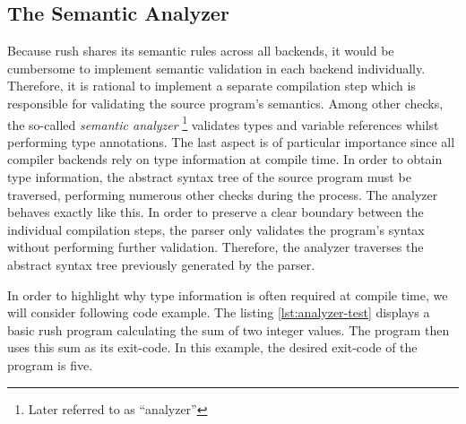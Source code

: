\subsection{The Semantic Analyzer}
Because rush shares its semantic rules across all backends,
it would be cumbersome to implement semantic validation in each
backend individually. Therefore, it is rational to implement a separate
compilation step which is responsible for validating the source program's semantics.
Among other checks, the so-called \emph{semantic analyzer} \footnote{Later referred to as \enquote{analyzer}} validates types
and variable references whilst performing type annotations. The last aspect is
of particular importance since all compiler backends rely on type information at
compile time. In order to obtain type information, the abstract syntax
tree of the source program must be traversed, performing numerous other checks
during the process. The analyzer behaves exactly like this. In order to
preserve a clear boundary between the individual compilation steps, the parser
only validates the program's syntax without performing further validation.
Therefore, the analyzer traverses the abstract syntax tree previously generated
by the parser.

In order to highlight why type information is often required at compile time, we
will consider following code example. The listing \ref{lst:analyzer-test} displays a basic rush program
calculating the sum of two integer values.
The program then uses this sum as its exit-code.
In this example, the desired exit-code of the program is five.


